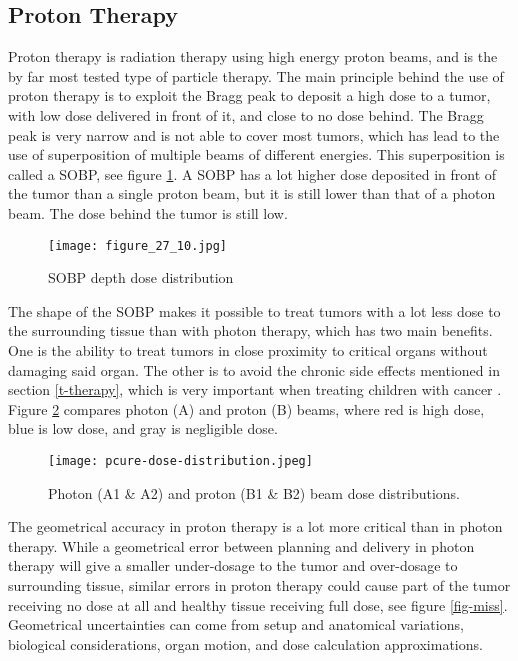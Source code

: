 \documentclass[../main/thesis.tex]{subfiles}
\begin{document}

\subsection{Proton Therapy} %
\label{t-proton}
Proton therapy is radiation therapy using high energy proton beams, and is the by far most tested type of particle therapy. The main principle behind the use of proton therapy is to exploit the Bragg peak to deposit a high dose to a tumor, with low dose delivered in front of it, and close to no dose behind. The Bragg peak is very narrow and is not able to cover most tumors, which has lead to the use of superposition of multiple beams of different energies. This superposition is called a \gls{SOBP}, see figure \ref{fig-sobp}. A \gls{SOBP} has a lot higher dose deposited in front of the tumor than a single proton beam, but it is still lower than that of a photon beam. The dose behind the tumor is still low. \citep[chap. 27]{Khan}

\begin{figure}[h!]
	\centering
	\texttt{[image: figure\_27\_10.jpg]}
	\caption{\gls{SOBP} depth dose distribution \citep[fig. 27.10]{Khan}}
	\label{fig-sobp}
\end{figure}


The shape of the \gls{SOBP} makes it possible to treat tumors with a lot less dose to the surrounding tissue than with photon therapy, which has two main benefits. One is the ability to treat tumors in close proximity to critical organs without damaging said organ. The other is to avoid the chronic side effects mentioned in section \ref{t-therapy}, which is very important when treating children with cancer \citep[chap. 27]{Khan}. Figure \ref{fig-photonproton-dose} compares photon (A) and proton (B) beams, where red is high dose, blue is low dose, and gray is negligible dose. 

\begin{figure}[h]
	\centering
	\texttt{[image: pcure-dose-distribution.jpeg]}
	\caption{Photon (A1 \& A2) and proton (B1 \& B2) beam dose distributions. \citetext{\citeauthor{pcure}}}
	\label{fig-photonproton-dose}
\end{figure}

The geometrical accuracy in proton therapy is a lot more critical than in photon therapy. While a geometrical error between planning and delivery in photon therapy will give a smaller under-dosage to the tumor and over-dosage to surrounding tissue, similar errors in proton therapy could cause part of the tumor receiving no dose at all and healthy tissue receiving full dose, see figure \ref{fig-miss}. Geometrical uncertainties can come from setup and anatomical variations, biological considerations, organ motion, and dose calculation approximations. \citep{Paganetti-range} 
\end{document}
